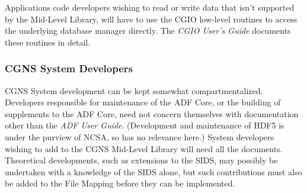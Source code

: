 Applications code developers wishing to read or write data
that isn't supported by the Mid-Level Library, will have
to use the CGIO low-level routines to access the underlying database
manager directly. The \textit{CGIO User's Guide} documents these
routines in detail.

\subsubsection{CGNS System Developers}

CGNS System development can be kept somewhat compartmentalized.
Developers responsible for maintenance of the ADF Core, or the building
of supplements to the ADF Core, need not concern themselves with
documentation other than the \textit{ADF User Guide}.
(Development and maintenance of HDF5 is under the purview of NCSA, so
has no relevance here.)
System developers wishing to add to the CGNS Mid-Level Library will need
all the documents.
Theoretical developments, such as extensions to the SIDS, may possibly
be undertaken with a knowledge of the SIDS alone, but such contributions
must also be added to the File Mapping before they can be implemented.
